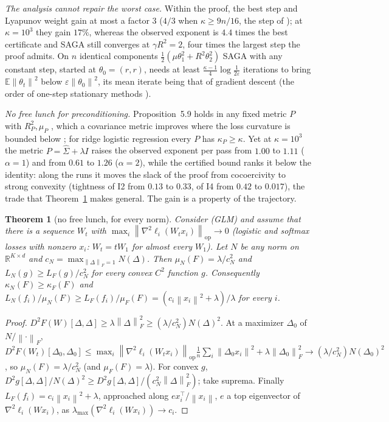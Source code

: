 \documentclass[10pt]{article}
\newtheorem{theorem}{Theorem}
\theoremstyle{remark}
\newcommand{\R}{\mathbb{R}}
\newcommand{\E}{\mathbb{E}}
\newcommand{\norm}[1]{\left\|#1\right\|}
\newcommand{\nop}[1]{\left\|#1\right\|_{\mathrm{op}}}
\newcommand{\nF}[1]{\left\|#1\right\|_{F}}
\newcommand{\kF}{\kappa_{F}}
\newcommand{\lmax}{\lambda_{\max}}
\begin{document}
\begin{description}[leftmargin=2.3em,labelwidth=2.0em,labelsep=0.3em,itemsep=1pt,topsep=3pt,parsep=0pt,font=\normalfont\bfseries]
\item[(C4)] \emph{The analysis cannot repair the worst case.} Within the proof, the best step and Lyapunov weight gain at
most a factor $3$ ($4/3$ when $\kappa\ge9n/16$, the step of \cite{hofmann2015variance}); at $\kappa=10^3$ they gain $17\%$,
whereas the observed exponent is $4.4$ times the best certificate and SAGA still converges at $\gamma R^2=2$, four times
the largest step the proof admits. On $n$ identical components $\frac12(\mu\theta_1^2+R^2\theta_2^2)$ SAGA with any
constant step, started at $\theta_0=(r,r)$, needs at least $\frac{\kappa-1}4\log\frac1{2\varepsilon}$ iterations to bring $\E\norm{\theta_t}^2$ below
$\varepsilon\norm{\theta_0}^2$, its mean iterate being that of gradient descent (the order of one-step stationary
methods \cite[Theorem~8]{arjevani2016lower}).
\item[(C5)] \emph{No free lunch for preconditioning.} Proposition~5.9 holds in any fixed metric $P$ with $R_P^2,\mu_P$
\cite{dragomir2021fast}, which a covariance metric improves where the loss curvature is bounded below
\cite{yang2014data,gonen2016solving}; for ridge logistic regression every $P$ has $\kappa_P\ge\kappa$. Yet at
$\kappa=10^3$ the metric $P=\hat\Sigma+\lambda I$ raises the observed exponent per pass from $1.00$ to $1.11$ ($\alpha=1$)
and from $0.61$ to $1.26$ ($\alpha=2$), while the certified bound ranks it below the identity: along the runs it moves the
slack of the proof from cocoercivity to strong convexity (tightness of I2 from $0.13$ to $0.33$, of I4 from $0.42$ to
$0.017$), the trade that Theorem~\ref{thm:nfl} makes general. The gain is a property of the trajectory.
\end{description}

\begin{theorem}[no free lunch, for every norm]\label{thm:nfl}
Consider (GLM) and assume that there is a sequence $W_t$ with $\max_i\nop{\nabla^2\ell_i(W_tx_i)}\to0$ (logistic and
softmax losses with nonzero $x_i$: $W_t=tW_1$ for almost every $W_1$). Let $N$ be any norm on $\R^{K\times d}$ and
$c_N=\max_{\nF\Delta=1}N(\Delta)$. Then $\mu_N(F)=\lambda/c_N^2$ and $L_N(g)\ge L_F(g)/c_N^2$ for every convex $C^2$
function $g$. Consequently $\kappa_N(F)\ge\kF(F)$ and $L_N(f_i)/\mu_N(F)\ge L_F(f_i)/\mu_F(F)=(c_i\norm{x_i}^2+\lambda)/\lambda$
for every $i$.
\end{theorem}
\begin{proof}
$D^2F(W)[\Delta,\Delta]\ge\lambda\nF\Delta^2\ge(\lambda/c_N^2)N(\Delta)^2$. At a maximizer $\Delta_0$ of $N/\nF\cdot$,
$D^2F(W_t)[\Delta_0,\Delta_0]\le\max_i\nop{\nabla^2\ell_i(W_tx_i)}\frac1n\sum_i\norm{\Delta_0x_i}^2+\lambda\nF{\Delta_0}^2
\to(\lambda/c_N^2)N(\Delta_0)^2$, so $\mu_N(F)=\lambda/c_N^2$ (and $\mu_F(F)=\lambda$). For convex $g$,
$D^2g[\Delta,\Delta]/N(\Delta)^2\ge D^2g[\Delta,\Delta]/(c_N^2\nF\Delta^2)$; take suprema. Finally $L_F(f_i)=c_i\norm{x_i}^2+\lambda$,
approached along $ex_i^\top/\norm{x_i}$, $e$ a top eigenvector of $\nabla^2\ell_i(Wx_i)$, as $\lmax(\nabla^2\ell_i(Wx_i))\to c_i$.
\end{proof}
\end{document}
